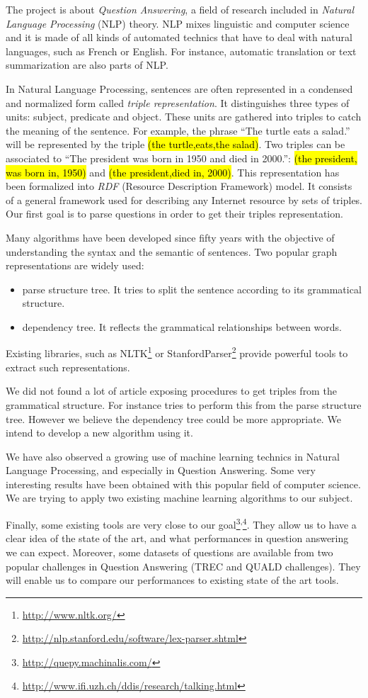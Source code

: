 The project is about \textit{Question Answering}, a field of research included in \textit{Natural Language Processing} (NLP) theory. NLP mixes linguistic and computer science and it is made of all kinds of automated technics that have to deal with natural languages, such as French or English. For instance, automatic translation or text summarization are also parts of NLP.

In Natural Language Processing, sentences are often represented in a condensed and normalized form called \textit{triple representation}. It distinguishes three types of units: subject, predicate and object. These units are gathered into triples to catch the meaning of the sentence. For example, the phrase ``The turtle eats a salad.'' will be represented by the triple \hl{(the turtle,eats,the salad)}. Two triples can be associated to ``The president was born in 1950 and died in 2000.'': \hl{(the president, was born in, 1950)} and \hl{(the president,died in, 2000)}. This representation has been formalized into \textit{RDF} (Resource Description Framework) model. It consists of a general framework used for describing any Internet resource by sets of triples. Our first goal is to parse questions in order to get their triples representation.

Many algorithms have been developed since fifty years with the objective of understanding the syntax and the semantic of sentences. Two popular graph representations are widely used:
\begin{itemize}
 \item parse structure tree. It tries to split the sentence according to its grammatical structure.
 \item dependency tree. It reflects the grammatical relationships between words.
\end{itemize}
Existing libraries, such as NLTK\footnote{\url{http://www.nltk.org/}} or StanfordParser\footnote{\url{http://nlp.stanford.edu/software/lex-parser.shtml}} provide powerful tools to extract such representations.

We did not found a lot of article exposing procedures to get triples from the grammatical structure. For instance \cite{tripleparsetree} tries to perform this from the parse structure tree. However we believe the dependency tree could be more appropriate. We intend to develop a new algorithm using it.

We have also observed a growing use of machine learning technics in Natural Language Processing, and especially in Question Answering. Some very interesting results have been obtained with this popular field of computer science. We are trying to apply two existing machine learning algorithms to our subject.

Finally, some existing tools are very close to our goal\footnote{\url{http://quepy.machinalis.com/}}\textsuperscript{,}\footnote{\url{http://www.ifi.uzh.ch/ddis/research/talking.html}}. They allow us to have a clear idea of the state of the art, and what performances in question answering we can expect. Moreover,  some datasets of questions are available from two popular challenges in Question Answering (TREC and QUALD challenges). They will enable us to compare our performances to existing state of the art tools.

